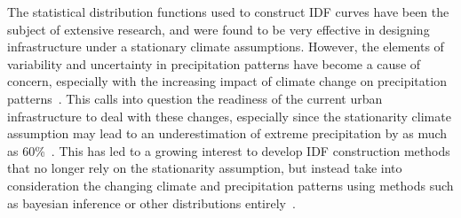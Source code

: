 The statistical distribution functions used to construct IDF curves have been the subject of extensive research, and were found to be very effective in designing infrastructure under a stationary climate assumptions. However, the elements of variability and uncertainty in precipitation patterns have become a cause of concern, especially with the increasing impact of climate change on precipitation patterns~\cite{Cheng2014}. This calls into question the readiness of the current urban infrastructure to deal with these changes, especially since the stationarity climate assumption may lead to an underestimation of extreme precipitation by as much as 60\%~\cite{Cheng2014}. This has led to a growing interest to develop IDF construction methods that no longer rely on the stationarity assumption, but instead take into consideration the changing climate and precipitation patterns using methods such as bayesian inference or other distributions entirely~\cite{Cheng2014, hess-2020-173, hess-27-2075-2023, hess-25-6133-2021}.